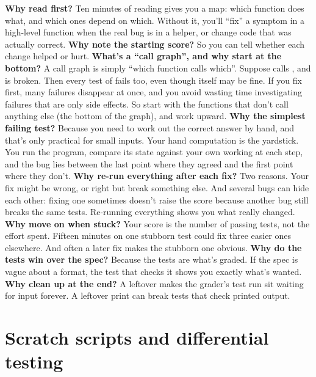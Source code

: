 \documentclass[10pt,a4paper]{article}
\begin{document}
\textbf{Why read first?} Ten minutes of reading gives you a map: which function does what, and which ones depend on which. Without it, you’ll “fix” a symptom in a high-level function when the real bug is in a helper, or change code that was actually correct.
\textbf{Why note the starting score?} So you can tell whether each change helped or hurt.
\textbf{What’s a “call graph”, and why start at the bottom?} A call graph is simply “which function calls which”. Suppose  calls , and  is broken. Then every test of  fails too, even though  itself may be fine. If you fix  first, many failures disappear at once, and you avoid wasting time investigating failures that are only side effects. So start with the functions that don’t call anything else (the bottom of the graph), and work upward.
\textbf{Why the simplest failing test?} Because you need to work out the correct answer by hand, and that’s only practical for small inputs. Your hand computation is the yardstick. You run the program, compare its state against your own working at each step, and the bug lies between the last point where they agreed and the first point where they don’t.
\textbf{Why re-run everything after each fix?} Two reasons. Your fix might be wrong, or right but break something else. And several bugs can hide each other: fixing one sometimes doesn’t raise the score because another bug still breaks the same tests. Re-running everything shows you what really changed.
\textbf{Why move on when stuck?} Your score is the number of passing tests, not the effort spent. Fifteen minutes on one stubborn test could fix three easier ones elsewhere. And often a later fix makes the stubborn one obvious.
\textbf{Why do the tests win over the spec?} Because the tests are what’s graded. If the spec is vague about a format, the test that checks it shows you exactly what’s wanted.
\textbf{Why clean up at the end?} A leftover  makes the grader’s test run sit waiting for input forever. A leftover print can break tests that check printed output.
\setcounter{section}{4}
\section{Scratch scripts and differential testing}
\end{document}
